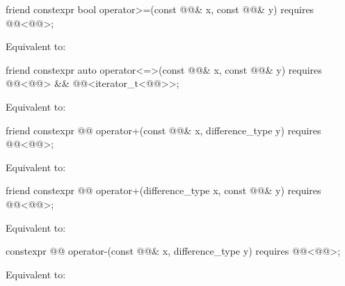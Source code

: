 \documentclass{wg21}
\begin{document}
\begin{itemdecl}
    friend constexpr bool operator>=(const @@& x, const @@& y)
    requires @@<@@>;
\end{itemdecl}

\begin{itemdescr}
    \pnum
    \effects
    Equivalent to: 
\end{itemdescr}

\begin{itemdecl}
    friend constexpr auto operator<=>(const @@& x, const @@& y)
    requires @@<@@> && @@<iterator_t<@@>>;
\end{itemdecl}

\begin{itemdescr}
    \pnum
    \effects
    Equivalent to: 
\end{itemdescr}

\begin{itemdecl}
    friend constexpr @@ operator+(const @@& x, difference_type y)
    requires @@<@@>;
\end{itemdecl}

\begin{itemdescr}
    \pnum
    \effects
    Equivalent to: 
\end{itemdescr}

\begin{itemdecl}
    friend constexpr @@ operator+(difference_type x, const @@& y)
    requires @@<@@>;
\end{itemdecl}

\begin{itemdescr}
    \pnum
    \effects
    Equivalent to: 
\end{itemdescr}

\begin{itemdecl}
    constexpr @@ operator-(const @@& x, difference_type y)
    requires @@<@@>;
\end{itemdecl}

\begin{itemdescr}
    \pnum
    \effects
    Equivalent to: 
\end{itemdescr}
\end{document}

